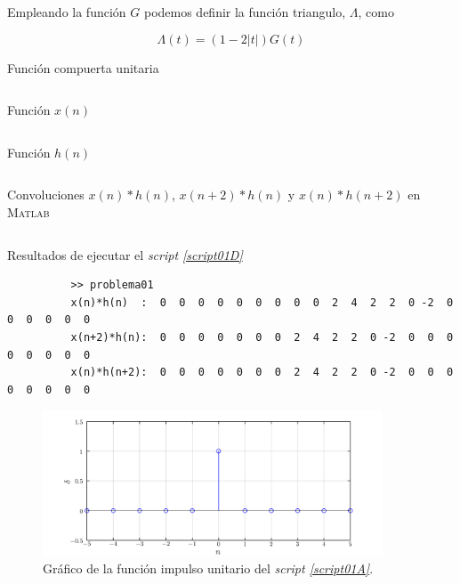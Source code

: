 \documentclass[a4paper,12pt,final]{article}
\begin{document}
      \noindent Empleando la función $G$ podemos definir la función triangulo,
      $\Lambda$, como

      \begin{equation*}
         \Lambda\left(t\right) = \left(1 - 2\left|t\right|\right)G\left(t\right)
      \end{equation*}


      \begin{listing}[H]
        \caption{Función compuerta unitaria}
        \label{script01A}
        \inputminted{matlab}{./laboratorio_4/gate.m}
      \end{listing}

      \begin{listing}[H]
        \caption{Función $x\left(n\right)$}
        \label{script01B}
        \inputminted{matlab}{./laboratorio_3/p1_X.m}
      \end{listing}

      \begin{listing}[H]
        \caption{Función $h\left(n\right)$}
        \label{script01C}
        \inputminted{matlab}{./laboratorio_3/p1_H.m}
      \end{listing}

      \begin{listing}[H]
        \caption{Convoluciones $x\left(n\right)*h\left(n\right)$, $x\left(n+2\right)*h\left(n\right)$ y $x\left(n\right)*h\left(n+2\right)$ en \textsc{Matlab} }
        \label{script01D}
        \inputminted{matlab}{./laboratorio_3/problema01.m}
      \end{listing}

      \begin{listing}[H]
        \caption{Resultados de ejecutar el \emph{script \ref{script01D}}}
        \label{script01E}
        \begin{verbatim}
          >> problema01
          x(n)*h(n)  :  0  0  0  0  0  0  0  0  0  2  4  2  2  0 -2  0  0  0  0  0  0
          x(n+2)*h(n):  0  0  0  0  0  0  0  2  4  2  2  0 -2  0  0  0  0  0  0  0  0
          x(n)*h(n+2):  0  0  0  0  0  0  0  2  4  2  2  0 -2  0  0  0  0  0  0  0  0
        \end{verbatim}
      \end{listing}

      \begin{figure}[H]
        \caption{Gráfico de la función impulso unitario del \emph{script \ref{script01A}}.}
        \label{script01Afigure}
        \includegraphics[width=0.90\textwidth]{./laboratorio_3/problema01_impulso.png}
      \end{figure}
\end{document}
